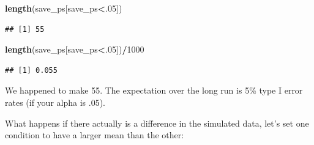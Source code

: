 \documentclass[]{book}
\newenvironment{Shaded}{\begin{snugshade}}{\end{snugshade}}
\newcommand{\ControlFlowTok}[1]{\textcolor[rgb]{0.13,0.29,0.53}{\textbf{#1}}}
\newcommand{\DataTypeTok}[1]{\textcolor[rgb]{0.13,0.29,0.53}{#1}}
\newcommand{\DecValTok}[1]{\textcolor[rgb]{0.00,0.00,0.81}{#1}}
\newcommand{\KeywordTok}[1]{\textcolor[rgb]{0.13,0.29,0.53}{\textbf{#1}}}
\newcommand{\NormalTok}[1]{#1}
\newcommand{\OperatorTok}[1]{\textcolor[rgb]{0.81,0.36,0.00}{\textbf{#1}}}
\newcommand{\StringTok}[1]{\textcolor[rgb]{0.31,0.60,0.02}{#1}}
\begin{document}
\begin{Shaded}
\begin{Highlighting}[]
\KeywordTok{length}\NormalTok{(save_ps[save_ps}\OperatorTok{<}\NormalTok{.}\DecValTok{05}\NormalTok{])}
\end{Highlighting}
\end{Shaded}

\begin{verbatim}
## [1] 55
\end{verbatim}

\begin{Shaded}
\begin{Highlighting}[]
\KeywordTok{length}\NormalTok{(save_ps[save_ps}\OperatorTok{<}\NormalTok{.}\DecValTok{05}\NormalTok{])}\OperatorTok{/}\DecValTok{1000}
\end{Highlighting}
\end{Shaded}

\begin{verbatim}
## [1] 0.055
\end{verbatim}

We happened to make 55. The expectation over the long run is 5\% type I error rates (if your alpha is .05).

What happens if there actually is a difference in the simulated data, let's set one condition to have a larger mean than the other:

\begin{Shaded}
\end{Shaded}
\end{document}
